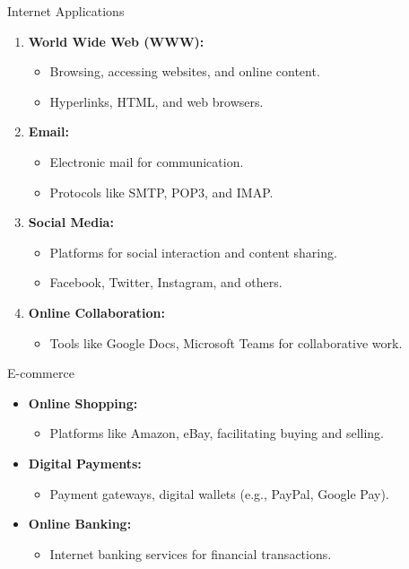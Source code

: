\begin{frame}{Internet Applications}
  \begin{enumerate}
    \item \textbf{World Wide Web (WWW):}
      \begin{itemize}
        \item Browsing, accessing websites, and online content.
        \item Hyperlinks, HTML, and web browsers.
      \end{itemize}
    \item \textbf{Email:}
      \begin{itemize}
        \item Electronic mail for communication.
        \item Protocols like SMTP, POP3, and IMAP.
      \end{itemize}
    \item \textbf{Social Media:}
      \begin{itemize}
        \item Platforms for social interaction and content sharing.
        \item Facebook, Twitter, Instagram, and others.
      \end{itemize}
    \item \textbf{Online Collaboration:}
      \begin{itemize}
        \item Tools like Google Docs, Microsoft Teams for collaborative work.
      \end{itemize}
  \end{enumerate}
\end{frame}

\begin{frame}{E-commerce}
  \begin{itemize}
    \item \textbf{Online Shopping:}
      \begin{itemize}
        \item Platforms like Amazon, eBay, facilitating buying and selling.
      \end{itemize}
    \item \textbf{Digital Payments:}
      \begin{itemize}
        \item Payment gateways, digital wallets (e.g., PayPal, Google Pay).
      \end{itemize}
    \item \textbf{Online Banking:}
      \begin{itemize}
        \item Internet banking services for financial transactions.
      \end{itemize}
  \end{itemize}
\end{frame}

